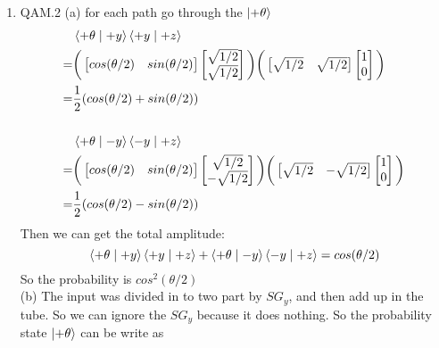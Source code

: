 \documentclass{article}
\providecommand{\bigp}[1]{\bigg( #1 \bigg)}
\providecommand{\Matrix}[1] {\begin{bmatrix} #1 \end{bmatrix}}
\theoremstyle{definition}
\theoremstyle{plain}
\begin{document}
\begin {enumerate}[itemindent=30pt,label=\bf Exercise {\arabic*}:]
\begin{align*}
   =& 0
\end{align*}
\begin{align*}
	&\Braket{-x|-x} \Braket{-x|-z} \Braket{-z|+x}\\
   =&\bigp{ \Matrix{ \sqrt{1/2} & -\sqrt{1/2}} \Matrix{ \sqrt{1/2}\\ -\sqrt{1/2}}} \bigp{ \Matrix{\sqrt{1/2} & -\sqrt{1/2}} \Matrix{0\\1}} \bigp{\Matrix{0 & 1} \Matrix{\sqrt{1/2} \\ \sqrt{1/2}}}\\
   =& \dfrac{1}{2} 
\end{align*}
\subitem the total amplitude of $\Ket{+x}$ is $\dfrac{1}{2} + 0 = \dfrac{1}{2}$, and the total amplitude of $\Ket{-x}$ is $\dfrac{1}{2} + 0 = \dfrac{1}{2}$.
\subitem The two wave,which are not orthogonal interference with each other, which cause the elimination of part of amplitude. So the total probability should be less than 1. It just likes the double slit interference of light. After go through the slits, the total intensity of light is less than before.
\item QAM.2
\subitem (a)
\subitem \qquad for each path go through the $\Ket{+\theta}$
\begin{align*}
	 &\Braket{+\theta \mid +y} \Braket{+y \mid +z}\\
	=&\bigp{\Matrix{cos(\theta / 2) & sin(\theta / 2)} \Matrix{\sqrt{1/2} \\ \sqrt{1/2}}} \bigp{\Matrix{\sqrt{1/2} & \sqrt{1/2}} \Matrix{ 1 \\ 0}}\\
	=&\dfrac{1}{2} (cos(\theta/2) + sin(\theta/2))\\ \\
	 &\Braket{+\theta \mid -y} \Braket{-y \mid +z}\\
	=&\bigp{\Matrix{cos(\theta / 2) & sin(\theta / 2)} \Matrix{\sqrt{1/2} \\ -\sqrt{1/2}}} \bigp{\Matrix{\sqrt{1/2} & -\sqrt{1/2}} \Matrix{ 1 \\ 0}}\\
	=&\dfrac{1}{2} (cos(\theta/2) - sin(\theta/2))\\
\end{align*}
\subitem  Then we can get the total amplitude:
	$$\Braket{+\theta \mid +y} \Braket{+y \mid +z} + \Braket{+\theta \mid -y} \Braket{-y \mid +z} = cos(\theta / 2)$$
\subitem So the probability is $cos^2(\theta / 2)$ \\
\subitem (b) The input was divided in to two part by $SG_{y}$, and then add up in the tube. So we can ignore the $SG_{y}$ because it does nothing. So the probability state $\Ket{+\theta}$ can be write as 

\end{enumerate}
\end{document}
